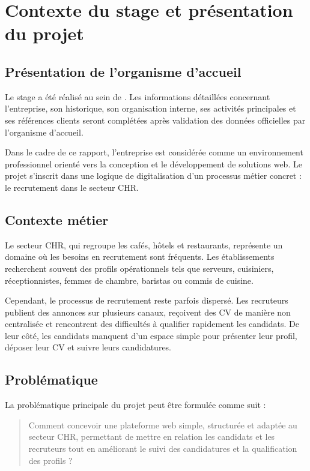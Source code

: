 \chapter{Contexte du stage et présentation du projet}

\section{Présentation de l'organisme d'accueil}

\noindent
Le stage a été réalisé au sein de \entreprise{}. Les informations détaillées concernant l'entreprise, son historique, son organisation interne, ses activités principales et ses références clients seront complétées après validation des données officielles par l'organisme d'accueil.

\noindent
Dans le cadre de ce rapport, l'entreprise est considérée comme un environnement professionnel orienté vers la conception et le développement de solutions web. Le projet \projectName{} s'inscrit dans une logique de digitalisation d'un processus métier concret : le recrutement dans le secteur CHR.

\section{Contexte métier}

\noindent
Le secteur CHR, qui regroupe les cafés, hôtels et restaurants, représente un domaine où les besoins en recrutement sont fréquents. Les établissements recherchent souvent des profils opérationnels tels que serveurs, cuisiniers, réceptionnistes, femmes de chambre, baristas ou commis de cuisine.

\noindent
Cependant, le processus de recrutement reste parfois dispersé. Les recruteurs publient des annonces sur plusieurs canaux, reçoivent des CV de manière non centralisée et rencontrent des difficultés à qualifier rapidement les candidats. De leur côté, les candidats manquent d'un espace simple pour présenter leur profil, déposer leur CV et suivre leurs candidatures.

\section{Problématique}

\noindent
La problématique principale du projet peut être formulée comme suit :

\begin{quote}
Comment concevoir une plateforme web simple, structurée et adaptée au secteur CHR, permettant de mettre en relation les candidats et les recruteurs tout en améliorant le suivi des candidatures et la qualification des profils ?
\end{quote}

